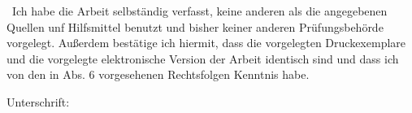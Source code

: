 \documentclass[a4paper,11pt]{book}
\numberwithin{equation}{chapter}
\theoremstyle{plain}
\theoremstyle{definition}
\begin{document}
\nocite{*}
\printbibliography[
heading=bibintoc,
title={Bibliography}
]




\newpage
\,
\newpage
\thispagestyle{empty}
\noindent Ich habe die Arbeit selbständig verfasst, keine anderen als die angegebenen Quellen unf Hilfsmittel benutzt und bisher keiner anderen Prüfungsbehörde vorgelegt. Außerdem bestätige ich hiermit, dass die vorgelegten Druckexemplare und die vorgelegte elektronische Version der Arbeit identisch sind und dass ich von den in  Abs. 6 vorgesehenen Rechtsfolgen Kenntnis habe.

\begin{flushright}
Unterschrift:
\end{flushright}
\end{document}
